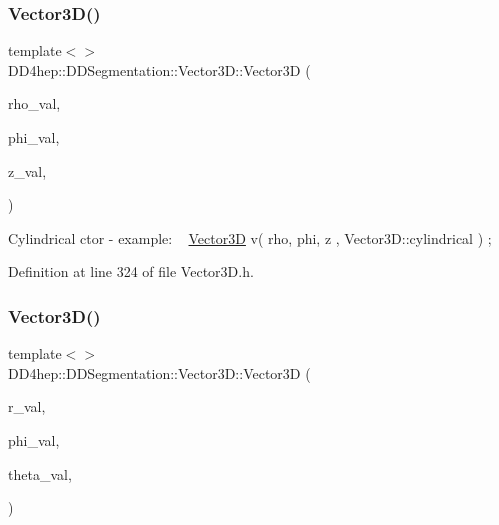 \subsubsection{\texorpdfstring{Vector3\+D()}{Vector3D()}\hspace{0.1cm}{\footnotesize\ttfamily [4/5]}}
{\footnotesize\ttfamily template$<$$>$ \\
D\+D4hep\+::\+D\+D\+Segmentation\+::\+Vector3\+D\+::\+Vector3D (\begin{DoxyParamCaption}\item[{double}]{rho\+\_\+val,  }\item[{double}]{phi\+\_\+val,  }\item[{double}]{z\+\_\+val,  }\item[{\hyperlink{struct_d_d_surfaces_1_1_vector3_d_1_1_cylindrical}{Vector3\+D\+::\+Cylindrical}(\&)()}]{ }\end{DoxyParamCaption})\hspace{0.3cm}{\ttfamily [inline]}}

Cylindrical c\textquotesingle{}tor -\/ example\+: ~\newline
 \hyperlink{struct_d_d4hep_1_1_d_d_segmentation_1_1_vector3_d}{Vector3D} v( rho, phi, z , Vector3\+D\+::cylindrical ) ; 

Definition at line 324 of file Vector3\+D.\+h.

\hypertarget{struct_d_d4hep_1_1_d_d_segmentation_1_1_vector3_d_ad625c504d14d11d0b65edaca042cb6c9}{}\label{struct_d_d4hep_1_1_d_d_segmentation_1_1_vector3_d_ad625c504d14d11d0b65edaca042cb6c9} 
\subsubsection{\texorpdfstring{Vector3\+D()}{Vector3D()}\hspace{0.1cm}{\footnotesize\ttfamily [5/5]}}
{\footnotesize\ttfamily template$<$$>$ \\
D\+D4hep\+::\+D\+D\+Segmentation\+::\+Vector3\+D\+::\+Vector3D (\begin{DoxyParamCaption}\item[{double}]{r\+\_\+val,  }\item[{double}]{phi\+\_\+val,  }\item[{double}]{theta\+\_\+val,  }\item[{\hyperlink{struct_d_d_surfaces_1_1_vector3_d_1_1_spherical}{Vector3\+D\+::\+Spherical}(\&)()}]{ }\end{DoxyParamCaption})\hspace{0.3cm}{\ttfamily [inline]}}

